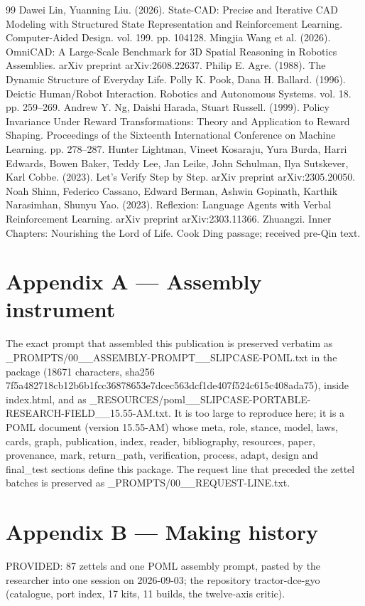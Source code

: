 \documentclass[11pt,a4paper]{article}
\begin{document}
\begin{thebibliography}{99}
 Dawei Lin, Yuanning Liu. (2026). State-CAD: Precise and Iterative CAD Modeling with Structured State Representation and Reinforcement Learning. Computer-Aided Design. vol. 199. pp. 104128.
 Mingjia Wang et al. (2026). OmniCAD: A Large-Scale Benchmark for 3D Spatial Reasoning in Robotics Assemblies. arXiv preprint arXiv:2608.22637.
 Philip E. Agre. (1988). The Dynamic Structure of Everyday Life.
 Polly K. Pook, Dana H. Ballard. (1996). Deictic Human/Robot Interaction. Robotics and Autonomous Systems. vol. 18. pp. 259--269.
 Andrew Y. Ng, Daishi Harada, Stuart Russell. (1999). Policy Invariance Under Reward Transformations: Theory and Application to Reward Shaping. Proceedings of the Sixteenth International Conference on Machine Learning. pp. 278--287.
 Hunter Lightman, Vineet Kosaraju, Yura Burda, Harri Edwards, Bowen Baker, Teddy Lee, Jan Leike, John Schulman, Ilya Sutskever, Karl Cobbe. (2023). Let's Verify Step by Step. arXiv preprint arXiv:2305.20050.
 Noah Shinn, Federico Cassano, Edward Berman, Ashwin Gopinath, Karthik Narasimhan, Shunyu Yao. (2023). Reflexion: Language Agents with Verbal Reinforcement Learning. arXiv preprint arXiv:2303.11366.
 Zhuangzi. Inner Chapters: Nourishing the Lord of Life. Cook Ding passage; received pre-Qin text.
\end{thebibliography}
\section*{Appendix A --- Assembly instrument}
The exact prompt that assembled this publication is preserved verbatim as \_PROMPTS/00\_\_ASSEMBLY-PROMPT\_\_SLIPCASE-POML.txt in the package (18671 characters, sha256 7f5a482718cb12b6b1fcc36878653e7dcec563dcf1de407f524c615c408ada75), inside index.html, and as \_RESOURCES/poml\_\_SLIPCASE-PORTABLE-RESEARCH-FIELD\_\_15.55-AM.txt. It is too large to reproduce here; it is a POML document (version 15.55-AM) whose meta, role, stance, model, laws, cards, graph, publication, index, reader, bibliography, resources, paper, provenance, mark, return\_path, verification, process, adapt, design and final\_test sections define this package. The request line that preceded the zettel batches is preserved as \_PROMPTS/00\_\_REQUEST-LINE.txt.
\section*{Appendix B --- Making history}
PROVIDED: 87 zettels and one POML assembly prompt, pasted by the researcher into one session on 2026-09-03; the repository tractor-dce-gyo (catalogue, port index, 17 kits, 11 builds, the twelve-axis critic).
\end{document}
